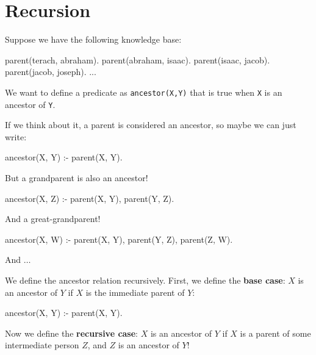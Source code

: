 \section{Recursion}

Suppose we have the following knowledge base:

\begin{codeblock}
parent(terach, abraham).
parent(abraham, isaac).
parent(isaac, jacob).
parent(jacob, joseph).
...
\end{codeblock}

We want to define a predicate  as \texttt{ancestor(X,Y)} that is true when \texttt{X} is an ancestor of \texttt{Y}.

If we think about it, a parent is considered an ancestor, so maybe we can just write:

\begin{codeblock}
ancestor(X, Y) :- parent(X, Y).
\end{codeblock}

But a grandparent is also an ancestor!

\begin{codeblock}
ancestor(X, Z) :- parent(X, Y), parent(Y, Z).
\end{codeblock}

And a great-grandparent!

\begin{codeblock}
ancestor(X, W) :- parent(X, Y), parent(Y, Z), parent(Z, W).
\end{codeblock}

And $\dots$



We define the ancestor relation recursively. First, we define the \textbf{base case}: $X$ is an ancestor of $Y$ if $X$ is the immediate parent of $Y$:

\begin{codeblock}
ancestor(X, Y) :-
    parent(X, Y).
\end{codeblock}

Now we define the \textbf{recursive case}: $X$ is an ancestor of $Y$ if $X$ is a parent of some intermediate person $Z$, and $Z$ is an ancestor of $Y$!

